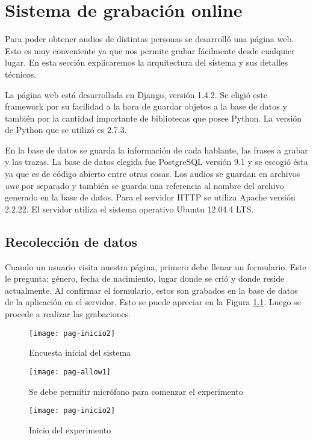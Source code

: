 \chapter{Sistema de grabación online}

Para poder obtener audios de distintas personas se desarrolló una página web. Esto es muy conveniente ya que nos permite grabar fácilmente desde cualquier lugar. En esta sección explicaremos la arquitectura del sistema y sus detalles técnicos.

La página web está desarrollada en Django, versión 1.4.2. Se eligió este framework por su facilidad a la hora de guardar objetos a la base de datos y también por la cantidad importante de bibliotecas que posee Python. La versión de Python que se utilizó es 2.7.3. 

En la base de datos se guarda la información de cada hablante, las frases a grabar y las trazas. La base de datos elegida fue PostgreSQL versión 9.1 y se escogió ésta ya que es de código abierto entre otras cosas. Los audios se guardan en archivos \textit{wav} por separado y también se guarda una referencia al nombre del archivo generado en la base de datos. Para el servidor HTTP se utiliza Apache versión 2.2.22. El servidor utiliza el sistema operativo Ubuntu 12.04.4 LTS.

\section{Recolección de datos}

Cuando un usuario visita nuestra página, primero debe llenar un formulario. Este le pregunta: género, fecha de nacimiento, lugar donde se crió y donde reside actualmente. Al confirmar el formulario, estos son grabados en la base de datos de la aplicación en el servidor. Esto se puede apreciar en la Figura \ref{figEncuesta}. Luego se procede a realizar las grabaciones. 

\begin{figure}[h!]
    \centerline{\texttt{[image: pag-inicio2]} }
    \caption{Encuesta inicial del sistema}
    \label{figEncuesta}
\end{figure}

\begin{figure}[h!]
    \centerline{\texttt{[image: pag-allow1]} }
    \caption{Se debe permitir micrófono para comenzar el experimento}
    \label{allowmic}
\end{figure}

\begin{figure}[h!]
    \centerline{\texttt{[image: pag-inicio2]} }
    \caption{Inicio del experimento}
    \label{inicio}
\end{figure}

